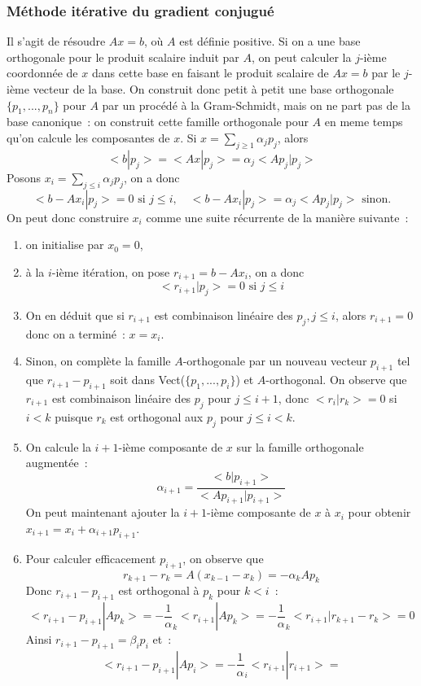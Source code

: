 \documentclass[a4paper,11pt]{article}
\begin{document}
\begin{giacjshere}
\subsubsection{M\'ethode it\'erative du gradient conjugu\'e}
Il s'agit de résoudre $Ax=b$, où $A$ est définie positive. 
Si on a une base orthogonale pour le produit scalaire induit par $A$, 
on peut calculer la $j$-ième coordonn\'ee de $x$ 
dans cette base en faisant le produit scalaire de 
$Ax=b$ par le $j$-ième vecteur de la base. 
On construit donc petit à petit une base orthogonale 
$\{ p_1,...,p_n \}$ pour $A$ par un procédé à la Gram-Schmidt, 
mais on ne part pas de la base canonique~: 
on construit cette famille orthogonale pour $A$ 
en meme temps qu'on calcule les composantes de $x$.
Si $x=\sum_{j\geq 1} \alpha_j p_j$, alors 
$$<b|p_j>=<Ax|p_j>=\alpha_j <Ap_j|p_j>$$
Posons $x_i=\sum_{j\leq i} \alpha_j p_j$, on a donc
$$<b-Ax_i|p_j>=0 \mbox{ si } j\leq i, \quad 
<b-Ax_i|p_j>=\alpha_j <Ap_j|p_j> \mbox{ sinon.}$$
On peut donc construire $x_i$ comme une suite r\'ecurrente de 
la mani\`ere suivante~: 
\begin{enumerate}
\item on initialise par $x_0=0$, 
\item à la $i$-ième itération, on pose $r_{i+1}=b-Ax_i$, on a donc
$$<r_{i+1}|p_j>=0 \mbox{ si } j\leq i $$
\item
On en d\'eduit que si $r_{i+1}$ est combinaison lin\'eaire des $p_j, j
\leq i$, alors $r_{i+1}=0$ donc on a terminé~: $x=x_i$.
\item
Sinon, on complète la famille $A$-orthogonale par un nouveau vecteur
$p_{i+1}$ tel que $r_{i+1}-p_{i+1}$ soit dans Vect($\{
p_1,...,p_{i}\}$) et $A$-orthogonal. On observe que $r_{i+1}$ est combinaison
lin\'eaire des $p_j$ pour $j \leq i+1$, donc $<r_i|r_k>=0$ si $i<k$
puisque $r_k$ est orthogonal aux $p_j$ pour $j \leq i <k$.
\item
On calcule la $i+1$-ième composante de $x$ 
sur la famille orthogonale augment\'ee~:
$$\alpha_{i+1}=\frac{<b|p_{i+1}>}{<Ap_{i+1}|p_{i+1}>}$$
On peut maintenant ajouter la $i+1$-i\`eme composante de $x$ à $x_i$ 
pour obtenir $x_{i+1}=x_i+\alpha_{i+1}p_{i+1}$. 
\item Pour calculer efficacement $p_{i+1}$, on observe que
$$ r_{k+1}-r_k=A(x_{k-1}-x_{k})=-\alpha_k A p_k$$
Donc $r_{i+1}-p_{i+1}$ est orthogonal \`a $p_k$ pour $k<i$~:
$$<r_{i+1}-p_{i+1}|Ap_k>=-\frac1\alpha_k<r_{i+1}|Ap_k>=-\frac1\alpha_k<r_{i+1}|r_{k+1}-r_k>=0$$
Ainsi $r_{i+1}-p_{i+1}=\beta_{i} p_i $ et~:
$$<r_{i+1}-p_{i+1}|Ap_i>=-\frac1\alpha_i<r_{i+1}|r_{i+1}>=
$$
\end{enumerate}
\end{giacjshere}
\end{document}
